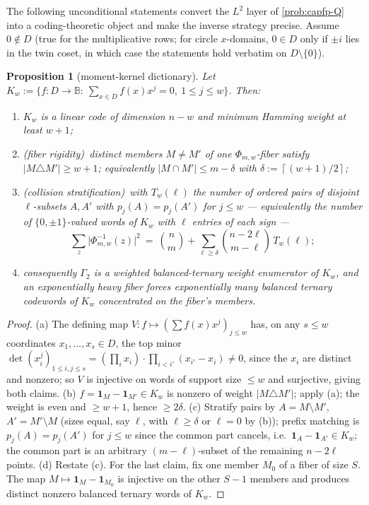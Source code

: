 \documentclass[11pt]{article}
\newtheorem{proposition}[proposition]{Proposition}
\theoremstyle{definition}
\theoremstyle{remark}
\newcommand{\B}{\mathbb{B}}
\providecommand{\ceil}[1]{\left\lceil #1\right\rceil}
\begin{document}
The following unconditional statements convert the $L^2$ layer of \cref{prob:capfp-Q} into a coding-theoretic object and make the inverse strategy precise.  Assume $0\notin D$ \textup(true for the multiplicative rows; for circle $x$-domains, $0\in D$ only if $\pm i$ lies in the twin coset, in which case the statements hold verbatim on $D\setminus\{0\}$\textup).

\begin{proposition}[moment-kernel dictionary]\label{prop:capfp-kernel}
Let $K_w:=\{f:D\to\B:\ \sum_{x\in D}f(x)x^j=0,\ 1\le j\le w\}$.  Then:
\begin{enumerate}[label=\textup{(\alph*)}]
\item $K_w$ is a linear code of dimension $n-w$ and minimum Hamming weight at least $w+1$;
\item \textup(fiber rigidity\textup)\ distinct members $M\ne M'$ of one $\Phi_{m,w}$-fiber satisfy $|M\triangle M'|\ge w+1$; equivalently $|M\cap M'|\le m-\delta$ with $\delta:=\ceil{(w+1)/2}$;
\item \textup(collision stratification\textup)\ with $T_w(\ell)$ the number of ordered pairs of disjoint $\ell$-subsets $A,A'$ with $p_j(A)=p_j(A')$ for $j\le w$ --- equivalently the number of $\{0,\pm1\}$-valued words of $K_w$ with $\ell$ entries of each sign ---
\[
        \sum_z\bigl|\Phi_{m,w}^{-1}(z)\bigr|^2
        \ =\ \binom nm+\sum_{\ell\ge\delta}\binom{n-2\ell}{m-\ell}\,T_w(\ell);
\]
\item consequently $\Gamma_2$ is a weighted balanced-ternary weight enumerator of $K_w$, and an exponentially heavy fiber forces exponentially many balanced ternary codewords of $K_w$ concentrated on the fiber's members.
\end{enumerate}
\end{proposition}

\begin{proof}
\textup{(a)}  The defining map $V:f\mapsto(\sum f(x)x^j)_{j\le w}$ has, on any $s\le w$ coordinates $x_1,\ldots,x_s\in D$, the top minor $\det(x_i^j)_{1\le i,j\le s}=(\prod_ix_i)\cdot\prod_{i<i'}(x_{i'}-x_i)\ne0$, since the $x_i$ are distinct and nonzero; so $V$ is injective on words of support size $\le w$ and surjective, giving both claims.
\textup{(b)}  $f=\mathbf1_{M}-\mathbf1_{M'}\in K_w$ is nonzero of weight $|M\triangle M'|$; apply \textup{(a)}; the weight is even and $\ge w+1$, hence $\ge2\delta$.
\textup{(c)}  Stratify pairs by $A=M\setminus M'$, $A'=M'\setminus M$ \textup(sizes equal, say $\ell$, with $\ell\ge\delta$ or $\ell=0$ by \textup{(b)}\textup); prefix matching is $p_j(A)=p_j(A')$ for $j\le w$ since the common part cancels, i.e.\ $\mathbf1_A-\mathbf1_{A'}\in K_w$; the common part is an arbitrary $(m-\ell)$-subset of the remaining $n-2\ell$ points.
\textup{(d)}  Restate \textup{(c)}.  For the last claim, fix one member $M_0$ of a fiber of size $S$.  The map $M\mapsto\mathbf1_M-\mathbf1_{M_0}$ is injective on the other $S-1$ members and produces distinct nonzero balanced ternary words of $K_w$.
\end{proof}
\end{document}
